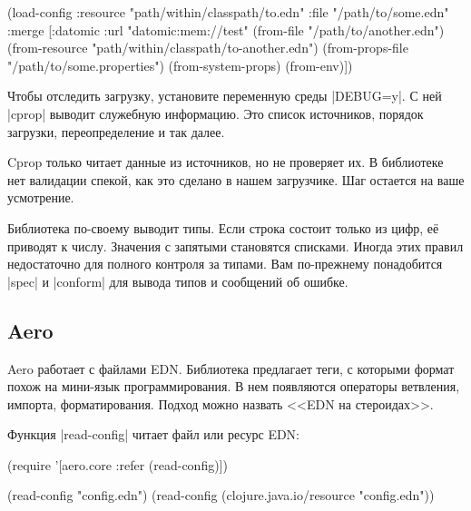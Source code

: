 \begin{english}
  \begin{clojure}
(load-config
 :resource "path/within/classpath/to.edn"
 :file "/path/to/some.edn"
 :merge [{:datomic {:url "datomic:mem://test"}}
         (from-file "/path/to/another.edn")
         (from-resource "path/within/classpath/to-another.edn")
         (from-props-file "/path/to/some.properties")
         (from-system-props)
         (from-env)])
  \end{clojure}
\end{english}

Чтобы отследить загрузку, установите переменную среды \spverb|DEBUG=y|. С ней
\spverb|cprop| выводит служебную информацию. Это список источников, порядок
загрузки, переопределение и так далее.

Cprop только читает данные из источников, но не проверяет их. В библиотеке нет
валидации спекой, как это сделано в нашем загрузчике. Шаг остается на ваше
усмотрение.

Библиотека по-своему выводит типы. Если строка состоит только из цифр, е\"{е}
приводят к числу. Значения с запятыми становятся списками. Иногда этих правил
недостаточно для полного контроля за типами. Вам по-прежнему понадобится
\spverb|spec| и \spverb|conform| для вывода типов и сообщений об ошибке.

\subsection{Aero}


Aero работает с файлами EDN. Библиотека
предлагает теги, с которыми формат похож на мини-язык программирования. В нем
появляются операторы ветвления, импорта, форматирования. Подход можно назвать
<<EDN на стероидах>>.


Функция \spverb|read-config| читает файл или ресурс EDN:

\begin{english}
  \begin{clojure}
(require '[aero.core :refer (read-config)])

(read-config "config.edn")
(read-config (clojure.java.io/resource "config.edn"))
  \end{clojure}
\end{english}



